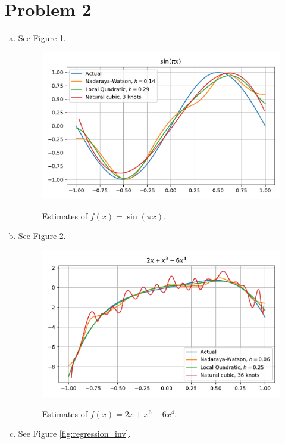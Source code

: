 \documentclass[letterpaper]{article}
\begin{document}
\section*{Problem 2}
\begin{enumerate}[(a)]
  
\item See Figure \ref{fig:regression_sin}.
  \begin{figure}
    \centering
    \includegraphics{regression_sin.pdf}
    \label{fig:regression_sin}
    \caption{Estimates of $f(x) = \sin\left(\pi x\right)$.}
  \end{figure}
\item See Figure \ref{fig:regression_poly}.
  \begin{figure}
    \centering
    \includegraphics{regression_poly.pdf}
    \label{fig:regression_poly}
    \caption{Estimates of $f(x) = 2x + x^6 - 6x^4$.}
  \end{figure}
\item See Figure \ref{fig:regression_inv}.

\end{enumerate}
\end{document}
